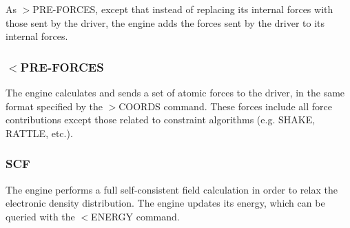 As {\ttfamily $>$P\-R\-E-\/\-F\-O\-R\-C\-E\-S}, except that instead of replacing its internal forces with those sent by the driver, the engine adds the forces sent by the driver to its internal forces.\hypertarget{index_recv_preforces}{}\subsubsection{$<$\-P\-R\-E-\/\-F\-O\-R\-C\-E\-S}\label{index_recv_preforces}
The engine calculates and sends a set of atomic forces to the driver, in the same format specified by the {\ttfamily $>$C\-O\-O\-R\-D\-S} command. These forces include all force contributions except those related to constraint algorithms (e.\-g. S\-H\-A\-K\-E, R\-A\-T\-T\-L\-E, etc.).\hypertarget{index_scf_command}{}\subsubsection{S\-C\-F}\label{index_scf_command}
The engine performs a full self-\/consistent field calculation in order to relax the electronic density distribution. The engine updates its energy, which can be queried with the {\ttfamily $<$E\-N\-E\-R\-G\-Y} command. 